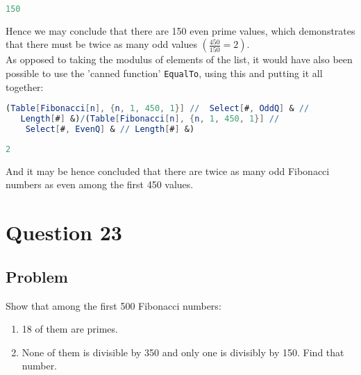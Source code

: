 \documentclass[12pt]{article}
\newenvironment{prob}[1][Problem]{%
	\sffamily \itshape   %
}{\endproof} %
\newenvironment{sol}[1][Problem]{%
	\proof[\nopunct]  %
}{\endproof}
\begin{document}
\begin{sol}
\begin{lstlisting}[language = Mathematica]
150
\end{lstlisting}	

Hence we may conclude that there are 150 even prime values, which demonstrates that there must be twice as many odd values $\left( \frac{450}{150} = 2 \right)$.\\

As opposed to taking the modulus of elements of the list, it would have also been possible to use the 'canned function' \verb|EqualTo|, using this and putting it all together:

\begin{lstlisting}[language = Mathematica]
(Table[Fibonacci[n], {n, 1, 450, 1}] //  Select[#, OddQ] & // 
   Length[#] &)/(Table[Fibonacci[n], {n, 1, 450, 1}] // 
    Select[#, EvenQ] & // Length[#] &)
\end{lstlisting}	

\begin{lstlisting}[language = Mathematica]
2
\end{lstlisting}	

And it may be hence concluded that there are twice as many odd Fibonacci numbers as even among the first 450 values.\\

\end{sol}

\newpage


\section{Question 23}

\subsection{Problem}

\begin{prob}


Show that among the first 500 Fibonacci numbers:


\begin{enumerate}[label=\alph*.]
  \item 18 of them are primes.
  \item None of them is divisible by 350 and only one is divisibly by 150. Find that number.
\end{enumerate}

\end{prob}
\end{document}
